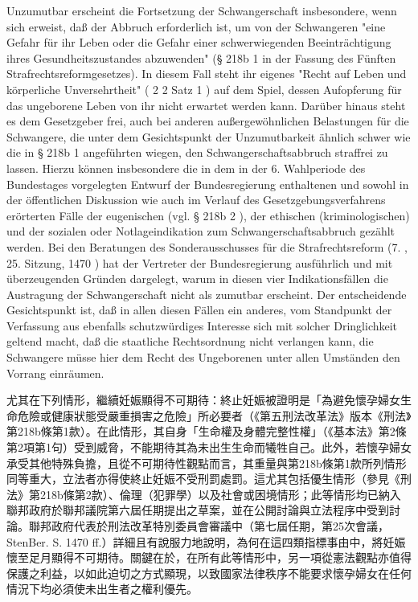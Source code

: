 \documentclass[12pt]{article}
\begin{document}
\syncleft
\begin{sourcepara}
Unzumutbar erscheint die Fortsetzung der Schwangerschaft insbesondere, wenn sich erweist, daß der Abbruch erforderlich ist, um von der Schwangeren "eine Gefahr für ihr Leben oder die Gefahr einer schwerwiegenden Beeinträchtigung ihres Gesundheitszustandes abzuwenden" (§ 218b \abbrNr{} 1 \abbrStGB{} in der Fassung des Fünften Strafrechtsreformgesetzes). In diesem Fall steht ihr eigenes "Recht auf Leben und körperliche Unversehrtheit" (\abbrArt{} 2 \abbrAbs{} 2 Satz 1 \abbrGG{}\ggfnArtTwoTwoOneDE{}) auf dem Spiel, dessen Aufopferung für das ungeborene Leben von ihr nicht erwartet werden kann. Darüber hinaus steht es dem Gesetzgeber frei, auch bei anderen außergewöhnlichen Belastungen für die Schwangere, die unter dem Gesichtspunkt der Unzumutbarkeit ähnlich schwer wie die in § 218b \abbrNr{} 1 angeführten wiegen, den Schwangerschaftsabbruch straffrei zu lassen. Hierzu können insbesondere die in dem in der 6. Wahlperiode des Bundestages vorgelegten Entwurf der Bundesregierung enthaltenen und sowohl in der öffentlichen Diskussion wie auch im Verlauf des Gesetzgebungsverfahrens erörterten Fälle der eugenischen (vgl. § 218b \abbrNr{} 2 \abbrStGB{}), der ethischen (kriminologischen) und der sozialen oder Notlageindikation zum Schwangerschaftsabbruch gezählt werden. Bei den Beratungen des Sonderausschusses für die Strafrechtsreform (7. \abbrWp{}, 25. Sitzung, \abbrStenBer{} \abbrS{} 1470 \abbrFF{}) hat der Vertreter der Bundesregierung ausführlich und mit überzeugenden Gründen dargelegt, warum in diesen vier Indikationsfällen die Austragung der Schwangerschaft nicht als zumutbar erscheint. Der entscheidende Gesichtspunkt ist, daß in allen diesen Fällen ein anderes, vom Standpunkt der Verfassung aus ebenfalls schutzwürdiges Interesse sich mit solcher Dringlichkeit geltend macht, daß die staatliche Rechtsordnung nicht verlangen kann, die Schwangere müsse hier dem Recht des Ungeborenen unter allen Umständen den Vorrang einräumen.
\end{sourcepara}
\begin{transpara}
尤其在下列情形，繼續妊娠顯得不可期待：終止妊娠被證明是「為避免懷孕婦女生命危險或健康狀態受嚴重損害之危險」所必要者（《第五刑法改革法》版本《刑法》第218b條第1款）。在此情形，其自身「生命權及身體完整性權」（《基本法》第2條第2項第1句）受到威脅，不能期待其為未出生生命而犧牲自己。此外，若懷孕婦女承受其他特殊負擔，且從不可期待性觀點而言，其重量與第218b條第1款所列情形同等重大，立法者亦得使終止妊娠不受刑罰處罰。這尤其包括優生情形（參見《刑法》第218b條第2款）、倫理（犯罪學）以及社會或困境情形；此等情形均已納入聯邦政府於聯邦議院第六屆任期提出之草案，並在公開討論與立法程序中受到討論。聯邦政府代表於刑法改革特別委員會審議中（第七屆任期，第25次會議，StenBer. S. 1470 ff.）詳細且有說服力地說明，為何在這四類指標事由中，將妊娠懷至足月顯得不可期待。關鍵在於，在所有此等情形中，另一項從憲法觀點亦值得保護之利益，以如此迫切之方式顯現，以致國家法律秩序不能要求懷孕婦女在任何情況下均必須使未出生者之權利優先。
\end{transpara}
\end{document}
